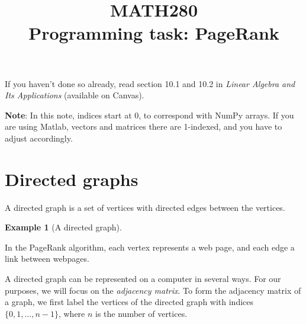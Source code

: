 \documentclass[a4paper]{scrartcl}
\title{MATH280\\ Programming task: PageRank}
\date{}
\theoremstyle{definition}
\newtheorem*{example}{Example}
\begin{document}
	\maketitle
	
	If you haven't done so already, read section 10.1 and 10.2 in \emph{Linear Algebra and Its Applications} (available on Canvas).
	
	\textbf{Note}: In this note, indices start at 0, to correspond with NumPy arrays. If you are using Matlab, vectors and matrices there are 1-indexed, and you have to adjust accordingly.
	
	\section{Directed graphs}
	A directed graph is a set of vertices with directed edges between the vertices.
	\begin{example}[A directed graph]
	\phantom{x}\\
	\end{example}
	In the PageRank algorithm, each vertex represents a web page, and each edge a link between webpages.
	
	A directed graph can be represented on a computer in several ways. For our purposes, we will focus on the \emph{adjacency matrix}. To form the adjacency matrix of a graph, we first label the vertices of the directed graph with indices  $\{0,1,\dotsc, n-1\}$, where $n$ is the number of vertices.
	
\end{document}
